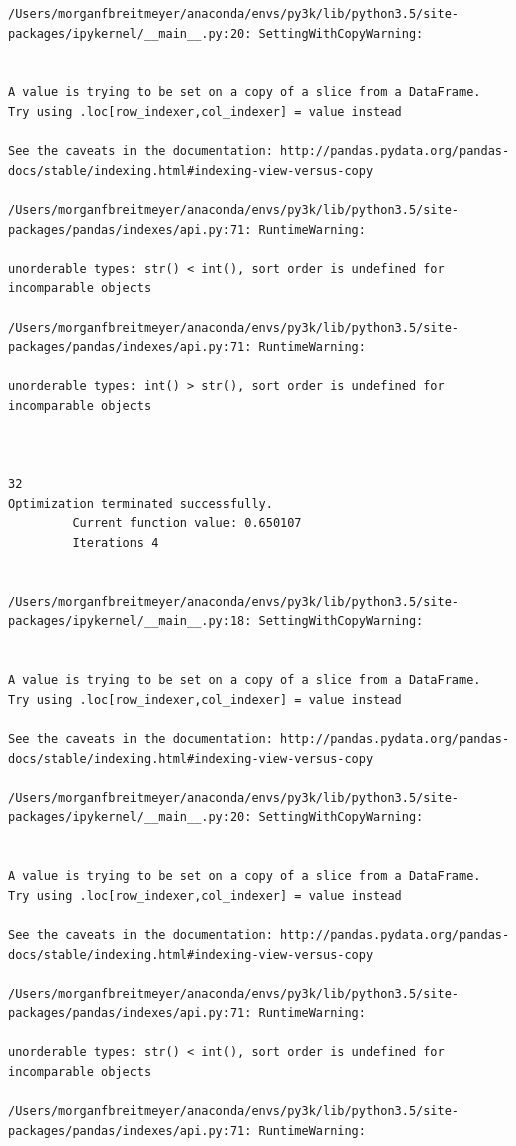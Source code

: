 \begin{lstlisting}
/Users/morganfbreitmeyer/anaconda/envs/py3k/lib/python3.5/site-packages/ipykernel/__main__.py:20: SettingWithCopyWarning:


A value is trying to be set on a copy of a slice from a DataFrame.
Try using .loc[row_indexer,col_indexer] = value instead

See the caveats in the documentation: http://pandas.pydata.org/pandas-docs/stable/indexing.html#indexing-view-versus-copy

/Users/morganfbreitmeyer/anaconda/envs/py3k/lib/python3.5/site-packages/pandas/indexes/api.py:71: RuntimeWarning:

unorderable types: str() < int(), sort order is undefined for incomparable objects

/Users/morganfbreitmeyer/anaconda/envs/py3k/lib/python3.5/site-packages/pandas/indexes/api.py:71: RuntimeWarning:

unorderable types: int() > str(), sort order is undefined for incomparable objects



32
Optimization terminated successfully.
         Current function value: 0.650107
         Iterations 4


/Users/morganfbreitmeyer/anaconda/envs/py3k/lib/python3.5/site-packages/ipykernel/__main__.py:18: SettingWithCopyWarning:


A value is trying to be set on a copy of a slice from a DataFrame.
Try using .loc[row_indexer,col_indexer] = value instead

See the caveats in the documentation: http://pandas.pydata.org/pandas-docs/stable/indexing.html#indexing-view-versus-copy

/Users/morganfbreitmeyer/anaconda/envs/py3k/lib/python3.5/site-packages/ipykernel/__main__.py:20: SettingWithCopyWarning:


A value is trying to be set on a copy of a slice from a DataFrame.
Try using .loc[row_indexer,col_indexer] = value instead

See the caveats in the documentation: http://pandas.pydata.org/pandas-docs/stable/indexing.html#indexing-view-versus-copy

/Users/morganfbreitmeyer/anaconda/envs/py3k/lib/python3.5/site-packages/pandas/indexes/api.py:71: RuntimeWarning:

unorderable types: str() < int(), sort order is undefined for incomparable objects

/Users/morganfbreitmeyer/anaconda/envs/py3k/lib/python3.5/site-packages/pandas/indexes/api.py:71: RuntimeWarning:


\end{lstlisting}
